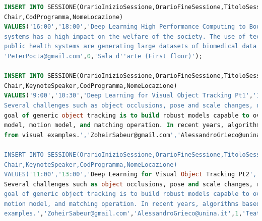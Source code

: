 \documentclass[a4page]{article}
\begin{document}
\begin{lstlisting}[language=SQL,
        deletekeywords={IDENTITY,INT},
        morekeywords={clustered},    
        framesep=10pt,
        framextopmargin=10pt]
INSERT INTO SESSIONE(OrarioInizioSessione,OrarioFineSessione,TitoloSessione,DescrizioneSessione,
Chair,CodProgramma,NomeLocazione)
VALUES('16:00','18:00','Deep Learning High Performance Computing to Boost Biomedical Applications','Healthcare is one of the key sectors of the global economy, especially in Europe. Any improvement in healthcare 
systems has a high impact on the welfare of the society. The use of technologies in health is clearly a strong path to more efficient healthcare, benefitting both individual people and the publicbudgets. European 
public health systems are generating large datasets of biomedical data in general, and images in particular, as most medical examinations use image-based processes.', 
'PeterPocta@gmail.com',0,'Sala d''arte (First floor)');

INSERT INTO SESSIONE(OrarioInizioSessione,OrarioFineSessione,TitoloSessione,DescrizioneSessione,
Chair,KeynoteSpeaker,CodProgramma,NomeLocazione)
VALUES('9:00','10:30','Deep Learning for Visual Object Tracking Pt1','In its simplest definition, visual object tracking consists in the persistent recognition and localization of a generic target object in a video. 
Several challenges such as object occlusions, pose and scale changes, rotations and shape variations, and the presence of similar objects, must be tackled to accurately keep track of a target's position. The ultimate
goal of generic object tracking is to build robust models capable to overcome such challenging factors. In the past, such issues have been addressed by disparate principles formalizing the concepts of appearance
model, motion model, and matching operation. In recent years, algorithms based on deep learning tried to learn such conceptual blocks by exploiting the ability of deep neural networks in learning complex functions 
from visual examples.','ZoheirSabeur@gmail.com','AlessandroGrieco@unina.it',1,'Teatrino');
	   
INSERT INTO SESSIONE(OrarioInizioSessione,OrarioFineSessione,TitoloSessione,DescrizioneSessione,
Chair,KeynoteSpeaker,CodProgramma,NomeLocazione)
VALUES('11:00','13:00','Deep Learning for Visual Object Tracking Pt2','In its simplest definition, visual object tracking consists in the persistent recognition and localization of a generic target object in a video.
Several challenges such as object occlusions, pose and scale changes, rotations and shape variations, and the presence of similar objects, must be tackled to accurately keep track of a target's position. The ultimate
goal of generic object tracking is to build robust models capable to overcome such challenging factors. In the past, such issues have been addressed by disparate principles formalizing the concepts of appearance model,
motion model, and matching operation. In recent years, algorithms based on deep learning tried to learn such conceptual blocks by exploiting the ability of deep neural networks in learning complex functions from visual 
examples.','ZoheirSabeur@gmail.com','AlessandroGrieco@unina.it',1,'Teatrino');	   


\end{lstlisting}
\end{document}
